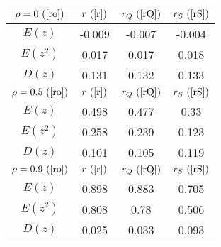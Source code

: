 \begin{tabular}{|c|c|c|c|}
\hline
$\rho = 0~(\ref{ro})$ & $r ~(\ref{r})$ & $r_Q ~(\ref{rQ})$ & $r_S ~(\ref{rS})$\\
\hline
$E(z)$ & -0.009 & -0.007 & -0.004\\
\hline
$E(z^2)$ & 0.017 & 0.017 & 0.018\\
\hline
$D(z)$ & 0.131 & 0.132 & 0.133\\
\hline
$\rho = 0.5~(\ref{ro})$ & $r ~(\ref{r})$ & $r_Q ~(\ref{rQ})$ & $r_S ~(\ref{rS})$\\
\hline
$E(z)$ & 0.498 & 0.477 & 0.33\\
\hline
$E(z^2)$ & 0.258 & 0.239 & 0.123\\
\hline
$D(z)$ & 0.101 & 0.105 & 0.119\\
\hline
$\rho = 0.9~(\ref{ro})$ & $r ~(\ref{r})$ & $r_Q ~(\ref{rQ})$ & $r_S ~(\ref{rS})$\\
\hline
$E(z)$ & 0.898 & 0.883 & 0.705\\
\hline
$E(z^2)$ & 0.808 & 0.78 & 0.506\\
\hline
$D(z)$ & 0.025 & 0.033 & 0.093\\
\hline
\end{tabular}